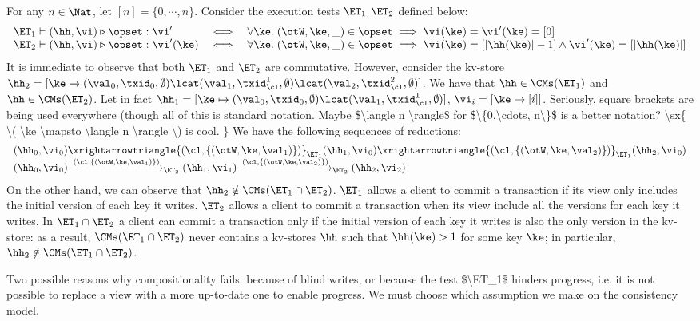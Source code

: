 \begin{example}
\label{ex:noblindwrites}
For any $n \in \Nat$, let $[n] = \{0,\cdots, n\}$.
Consider the execution tests $\ET_1, \ET_2$ defined below: 
\[
\begin{array}{lcl}
\ET_1 \vdash (\hh, \vi) \triangleright \opset : \vi' &\iff& 
\forall \ke.\;(\otW, \ke, \_) \in \opset \implies \vi(\ke) = \vi'(\ke) = [0]\\
\ET_2 \vdash (\hh, \vi) \triangleright \opset : \vi'(\ke) &\iff& 
\forall \ke. \;(\otW, \ke, \_ ) \in \opset \implies \vi(\ke) = [ \lvert \hh(\ke) \rvert - 1] \wedge \vi'(\ke) = [\lvert \hh(\ke) \rvert ] \\
\end{array}
\]
It is immediate to observe that both $\ET_1$ and $\ET_2$ are commutative. However, 
consider the kv-store $\hh_2 = [\ke \mapsto (\val_0, \txid_0, \emptyset) \lcat (\val_1, \txid_{\cl}^1, \emptyset) \lcat (\val_2, \txid_{\cl}^2, \emptyset)]$. 
We have that $\hh \in \CMs(\ET_1)$ and $\hh \in \CMs(\ET_2)$.
Let in fact $\hh_1 = [\ke \mapsto (\val_0, \txid_0, \emptyset) \lcat (\val_1, \txid_{\cl}^1, \emptyset)]$, $\vi_{i} = [\ke \mapsto [i] ]$.
\ac{Seriously, square brackets are being used everywhere (though all of this is standard notation. Maybe $\langle n \rangle$ for $\{0,\cdots, n\}$ is 
a better notation?
\sx{  \( \ke \mapsto \langle n \rangle \) is cool. }
}
We have the following sequences of reductions: 
\[
\begin{array}{l}
(\hh_0, \vi_0) \xrightarrowtriangle{(\cl, \{(\otW, \ke, \val_1)\})}_{\ET_1} 
(\hh_1, \vi_0) \xrightarrowtriangle{(\cl,\{(\otW, \ke, \val_2)\})}_{\ET_1} (\hh_2, \vi_0)\\
(\hh_0, \vi_0) \xrightarrow{(\cl, \{(\otW, \ke, \val_1)\})}_{\ET_2} (\hh_1, \vi_1) \xrightarrow{(\cl, \{(\otW, \ke, \val_2)\})}_{\ET_2} 
(\hh_2, \vi_2)
\end{array}
\]
On the other hand, we can observe that $\hh_2 \notin \CMs(\ET_1 \cap \ET_2)$. $\ET_1$ allows a client to 
commit a transaction if its view only includes the initial version of each key it writes. $\ET_2$ allows a client 
to commit a transaction when its view include all the versions for each key it writes. In $\ET_1 \cap \ET_2$ 
a client can commit a transaction only if the initial version of each key it writes is also the only version in the kv-store: 
as a result, $\CMs(\ET_1 \cap \ET_2)$ never contains a  kv-stores $\hh$ such that $\hh(\ke) > 1$ for some key $\ke$; 
in particular, $\hh_2 \notin \CMs(\ET_1 \cap \ET_2)$.
\end{example}
\ac{Two possible reasons why compositionality fails: because of blind writes, or because the test $\ET_1$ hinders progress, 
i.e. it is not possible to replace a view with a more up-to-date one to enable progress. We must choose which assumption 
we make on the consistency model.}

